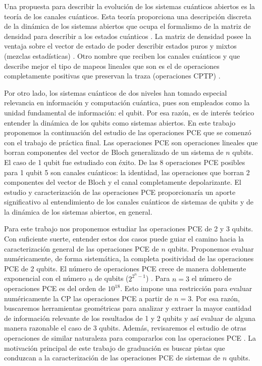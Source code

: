Una propuesta para describir la evolución de los sistemas cuánticos abiertos
es la teoría de los canales cuánticos. Esta teoría proporciona una descripción
discreta de la dinámica de los sistemas abiertos que ocupa el formalismo
de la matriz de densidad para describir a los estados cuánticos
\cite{nielsen_chuang_2011}. La matriz
de densidad posee la ventaja sobre el vector de estado de poder describir
estados puros y mixtos (mezclas estadísticas) \cite{sakurai_napolitano_2017}. 
Otro nombre que reciben 
los canales cuánticos y que describe mejor el tipo de mapeos lineales 
que son es el de operaciones completamente positivas que preservan la traza 
(operaciones CPTP) \cite{bengtsson_zyczkowski_2017}.

Por otro lado, los sistemas cuánticos de dos niveles han tomado especial
relevancia en información y computación cuántica, pues son empleados 
como la unidad fundamental de información: el qubit. Por esa razón, es
de interés teórico entender la dinámica de los qubits como sistemas 
abiertos. En este trabajo proponemos la continuación del estudio de 
las operaciones PCE que se comenzó con el trabajo de práctica final.
Las operaciones PCE son operaciones lineales que borran componentes
del vector de Bloch generalizado de un sistema de $n$ qubits. El caso 
de 1 qubit fue estudiado con éxito. De las 8 operaciones PCE posibles para
1 qubit 5 son canales cuánticos: la identidad, las operaciones que borran 2 
componentes del vector de Bloch y el canal completamente depolarizante.
El estudio y caracterización de las operaciones PCE proporcionaría 
un aporte significativo al entendimiento de los canales cuánticos de
sistemas de qubits y de la dinámica de los sistemas abiertos, en general.

Para este trabajo nos proponemos estudiar las operaciones PCE de 
2 y 3 qubits. Con suficiente suerte, entender estos dos casos
puede guiar el camino hacia la caracterización general de las operaciones
PCE de $n$ qubits. Proponemos evaluar numéricamente, de forma sistemática, 
la completa positividad de las operaciones PCE de 2 qubits. El número de
operaciones PCE crece de manera doblemente exponencial con el número $n$ de
qubits ($2^{2^n-1}$) . Para $n=3$ el número de 
operaciones PCE es del orden de $10^{18}$. Esto impone una restricción  
para evaluar numéricamente la CP las operaciones PCE a partir de $n=3$.
Por esa razón, buscaremos herramientas geométricas para analizar 
y extraer la mayor cantidad de información relevante de los 
resultados de 1 y 2 qubits y así evaluar de alguna manera razonable
el caso de 3 qubits. Además, revisaremos el 
estudio de otras operaciones de similar naturaleza para compararlos
con las operaciones PCE \cite{nathanson2007pauli}. 
La motivación principal de este trabajo de graduación 
es buscar pistas que conduzcan a la caracterización de las 
operaciones PCE de sistemas de $n$ qubits.


